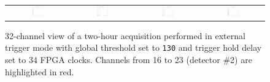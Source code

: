 \begin{figure}[hbt!]
\begin{tabular}{cccc}
        \includegraphics[width=0.204\textwidth]{Images/chap3/results/muons/ch_ext_trigger/incoming_energy_32channels_34_2hr_28.pdf} & \includegraphics[width=0.204\textwidth]{Images/chap3/results/muons/ch_ext_trigger/incoming_energy_32channels_34_2hr_29.pdf} & \includegraphics[width=0.204\textwidth]{Images/chap3/results/muons/ch_ext_trigger/incoming_energy_32channels_34_2hr_30.pdf} & \includegraphics[width=0.204\textwidth]{Images/chap3/results/muons/ch_ext_trigger/incoming_energy_32channels_34_2hr_31.pdf}\\
    \end{tabular}
    \caption{32-channel view of a two-hour acquisition performed in external trigger mode with global threshold set to \texttt{130} and trigger hold delay set to 34 FPGA clocks. Channels from 16 to 23 (detector \#2) are highlighted in red.}
    \label{figMUON32channels}
\end{figure}